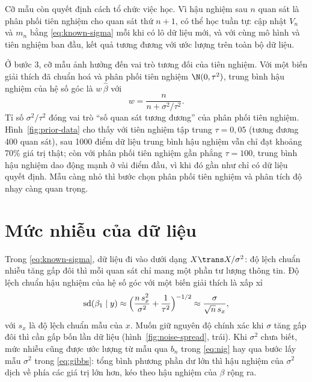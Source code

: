 \documentclass[12pt,a4paper]{report}
\begin{document}

Cỡ mẫu còn quyết định cách tổ chức việc học. Vì hậu nghiệm sau $n$ quan sát là
phân phối tiên nghiệm cho quan sát thứ $n+1$, có thể học tuần tự: cập nhật $V_n$ và $m_n$ bằng
\eqref{eq:known-sigma} mỗi khi có lô dữ liệu mới, và với cùng mô hình và tiên nghiệm ban đầu, kết quả tương đương với
ước lượng trên toàn bộ dữ liệu.

Ở bước 3, cỡ mẫu ảnh hưởng đến vai trò tương đối của tiên nghiệm. Với một biến giải thích đã
chuẩn hoá và phân phối tiên nghiệm $\N(0, \tau^2)$, trung bình hậu nghiệm của hệ số góc là
$w\,\hat\beta$ với
%
\begin{equation}
  \label{eq:shrinkage}
  w = \frac{n}{n + \sigma^2/\tau^2}.
\end{equation}
%
Tỉ số $\sigma^2/\tau^2$ đóng vai trò ``số quan sát tương đương'' của phân phối tiên nghiệm.
Hình~\ref{fig:prior-data} cho thấy với tiên nghiệm tập trung $\tau = 0{,}05$ (tương đương
400 quan sát), sau \num{1000} điểm dữ liệu trung bình hậu nghiệm vẫn chỉ đạt
khoảng 70\% giá trị thật; còn với phân phối tiên nghiệm gần phẳng $\tau = 100$, trung bình hậu
nghiệm dao động mạnh ở vài điểm đầu, vì khi đó gần như chỉ có dữ liệu quyết định.
Mẫu càng nhỏ thì bước chọn phân phối tiên nghiệm và phân tích độ nhạy càng quan trọng.


\section{Mức nhiễu của dữ liệu}
\label{sec:dep-noise}

Trong \eqref{eq:known-sigma}, dữ liệu đi vào dưới dạng $X\trans X / \sigma^2$:
độ lệch chuẩn nhiễu tăng gấp đôi thì mỗi quan sát chỉ mang một phần tư lượng thông tin. Độ lệch
chuẩn hậu nghiệm của hệ số góc với một biến giải thích là xấp xỉ
%
\begin{equation}
  \label{eq:slope-sd}
  \text{sd}(\beta_1 \mid y) \approx
  \Bigl(\frac{n\, s_x^2}{\sigma^2} + \frac{1}{\tau^2}\Bigr)^{-1/2}
  \approx \frac{\sigma}{\sqrt{n}\, s_x},
\end{equation}
%
với $s_x$ là độ lệch chuẩn mẫu của $x$. Muốn giữ nguyên độ chính xác khi $\sigma$
tăng gấp đôi thì cần gấp bốn lần dữ liệu (hình~\ref{fig:noise-spread}, trái).
Khi $\sigma^2$ chưa biết, mức nhiễu cũng được ước lượng từ mẫu qua $b_n$ trong
\eqref{eq:nig} hay qua bước lấy mẫu $\sigma^2$ trong \eqref{eq:gibbs}: tổng bình
phương phần dư lớn thì hậu nghiệm của $\sigma^2$ dịch về phía các giá trị lớn hơn, kéo theo hậu nghiệm
của $\beta$ rộng ra.
\end{document}

